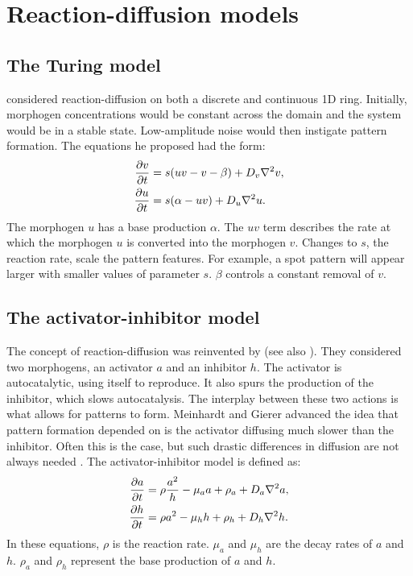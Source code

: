\section{Reaction-diffusion models}
\subsection{The Turing model}
\citet{turing1952} considered reaction-diffusion on both a discrete and continuous 1D ring. Initially, morphogen concentrations would be constant across the domain and the system would be in a stable state. Low-amplitude noise would then instigate pattern formation. The equations he proposed had the form:
	\begin{equation}
	\begin{aligned} \label{eq:turingRD}
			\frac{\partial v}{\partial t} &= s(uv-v-\beta) + D_v \nabla^2 v,\\
			\frac{\partial u}{\partial t} &= s(\alpha-uv) + D_u \nabla^2 u.
	\end{aligned}
	\end{equation}
The morphogen $u$ has a base production $\alpha$. The $uv$ term describes the rate at which the morphogen $u$ is converted into the morphogen $v$. Changes to $s$, the reaction rate, scale the pattern features. For example, a spot pattern will appear larger with smaller values of parameter $s$. $\beta$ controls a constant removal of $v$.

\subsection{The activator-inhibitor model}
The concept of reaction-diffusion was reinvented by \citet{gierer1972} (see also \citep{meinhardt1982}). They considered two morphogens, an activator $a$ and an inhibitor $h$. The activator is autocatalytic, using itself to reproduce. It also spurs the production of the inhibitor, which slows autocatalysis. The interplay between these two actions is what allows for patterns to form. Meinhardt and Gierer advanced the idea that pattern formation depended on is the activator diffusing much slower than the inhibitor. Often this is the case, but such drastic differences in diffusion are not always needed \citep{gray1984, marcon2016}. The activator-inhibitor model is defined as:
	\begin{equation}
	\begin{aligned} \label{eq:activatorInhibitorRD}
			\frac{\partial a}{\partial t} &= \rho \frac{a^2}{h} - \mu_a a + \rho_a + D_a \nabla^2 a,\\
			\frac{\partial h}{\partial t} &= \rho a^2 - \mu_h h  + \rho_h + D_h \nabla^2 h.
	\end{aligned}
	\end{equation}
In these equations, $\rho$ is the reaction rate. $\mu_a$ and $\mu_h$ are the decay rates of $a$ and $h$. $\rho_a$ and $\rho_h$ represent the base production of $a$ and $h$. 

